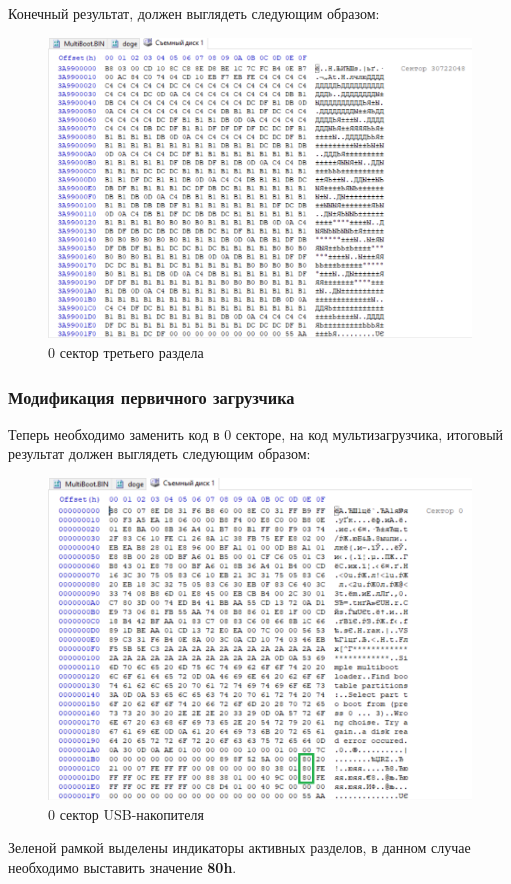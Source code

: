 Конечный результат, должен выглядеть следующим образом:
\begin{figure}[H]
  \centering
  \includegraphics[width=.9\textwidth]{img/p3/thirdDoge}
  \caption{0 сектор третьего раздела}
\end{figure}

\subsubsection{Модификация первичного загрузчика}
Теперь необходимо заменить код в 0 секторе, на код мультизагрузчика, итоговый результат должен выглядеть следующим образом:
\begin{figure}[H]
  \centering
  \includegraphics[width=.9\textwidth]{img/p3/actives}
  \caption{0 сектор USB-накопителя}
\end{figure}
Зеленой рамкой выделены индикаторы активных разделов, в данном случае необходимо выставить значение \textbf{80h}.

